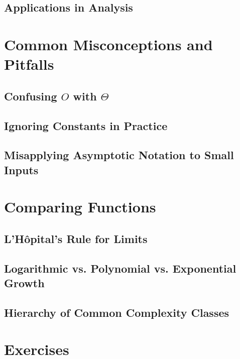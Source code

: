 \subsection{Applications in Analysis}

\section{Common Misconceptions and Pitfalls}
\subsection{Confusing $O$ with $\Theta$}
\subsection{Ignoring Constants in Practice}
\subsection{Misapplying Asymptotic Notation to Small Inputs}

\section{Comparing Functions}
\subsection{L'Hôpital's Rule for Limits}
\subsection{Logarithmic vs. Polynomial vs. Exponential Growth}
\subsection{Hierarchy of Common Complexity Classes}

\section{Exercises}